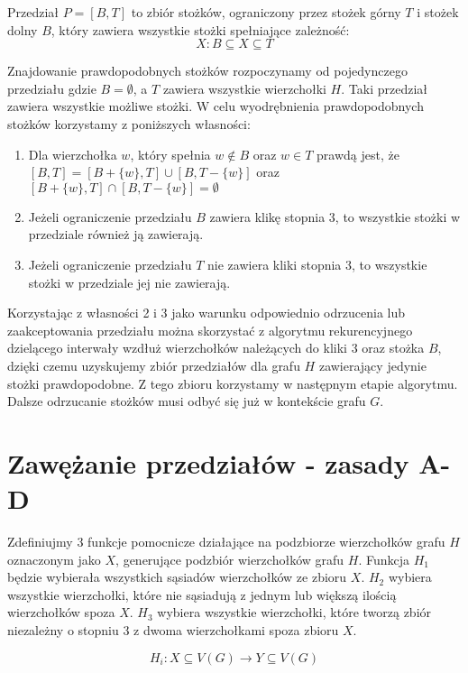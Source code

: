 \begin{definition}
Przedział $ P = [B, T]$ to zbiór stożków, ograniczony przez stożek górny $T$ i stożek dolny $B$, który zawiera wszystkie stożki spełniające zależność:  $$X: B \subseteq X \subseteq T$$ 
\end{definition}


Znajdowanie prawdopodobnych stożków rozpoczynamy od pojedynczego przedziału gdzie $B = \emptyset$, a $T$ zawiera wszystkie wierzchołki $H$. Taki przedział zawiera wszystkie możliwe stożki. W celu wyodrębnienia prawdopodobnych stożków korzystamy z poniższych własności:
\begin{enumerate}
\item Dla wierzchołka $w$, który spełnia $w \notin B$ oraz $w\in T$ prawdą jest, że $[B, T] = [B + \{ w\}, T] \cup [B , T - \{ w\}]$ oraz $[B +\{ w\}, T] \cap [B , T - \{ w\}] = \emptyset$

\item Jeżeli ograniczenie przedziału $B$ zawiera klikę stopnia 3, to wszystkie stożki w przedziale również ją zawierają. 

\item Jeżeli ograniczenie przedziału $T$ nie zawiera kliki stopnia 3, to wszystkie stożki w przedziale jej nie zawierają.
\end{enumerate}

Korzystając z własności 2 i 3 jako warunku odpowiednio odrzucenia lub zaakceptowania przedziału można skorzystać z algorytmu rekurencyjnego dzielącego interwały wzdłuż wierzchołków należących do kliki 3 oraz stożka $B$, dzięki czemu uzyskujemy zbiór przedziałów dla grafu $H$ zawierający jedynie stożki prawdopodobne. Z tego zbioru korzystamy w następnym etapie algorytmu.
Dalsze odrzucanie stożków musi odbyć się już w kontekście grafu $G$.
  

\section{Zawężanie przedziałów - zasady A-D}
Zdefiniujmy 3 funkcje pomocnicze działające na podzbiorze wierzchołków grafu $H$ oznaczonym jako $X$, generujące podzbiór wierzchołków grafu $H$. 
Funkcja $H_1$ będzie wybierała wszystkich sąsiadów wierzchołków ze zbioru $X$.
$H_2$ wybiera wszystkie wierzchołki, które nie sąsiadują z jednym lub większą ilością wierzchołków spoza $X$. 
$H_3$ wybiera wszystkie wierzchołki, które tworzą zbiór niezależny o stopniu 3 z dwoma wierzchołkami spoza zbioru $X$.

$$H_i: X \subseteq V(G) \to Y \subseteq V(G)$$

